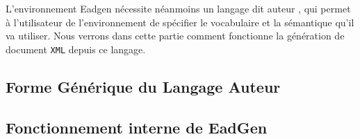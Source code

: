 L'environnement Eadgen nécessite néanmoins un langage dit \og 
auteur \fg, qui permet à l'utilisateur de l'environnement de spécifier
le vocabulaire et la sémantique qu'il va utiliser. Nous verrons dans
cette partie comment fonctionne la génération de document \texttt{XML} depuis ce
langage. 

\subsection{Forme Générique du Langage Auteur}


\subsection{Fonctionnement interne de EadGen}

